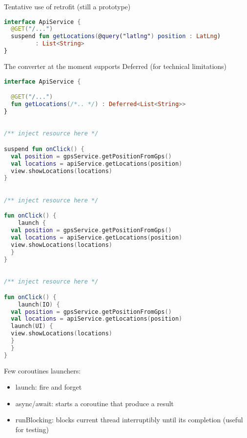 \documentclass[10pt]{beamer}
\begin{document}
\begin{frame}[fragile]
	Tentative use of retrofit (still a prototype) 
\begin{lstlisting}[language=Kotlin, basicstyle=\ttfamily]
interface ApiService {
  @GET("/...")
  suspend fun getLocations(@query("latlng") position : LatLng) 
	     : List<String> 
}
\end{lstlisting}
	The converter at the moment supports Deferred (for technical limitations) 
\begin{lstlisting}[language=Kotlin, basicstyle=\ttfamily]
interface ApiService {

  @GET("/...")
  fun getLocations(/*.. */) : Deferred<List<String>>
}
\end{lstlisting}
\end{frame}
\begin{frame}[fragile]
\begin{lstlisting}[language=Kotlin, basicstyle=\ttfamily]

/** inject resource here */

suspend fun onClick() {
  val position = gpsService.getPositionFromGps()
  val locations = apiService.getLocations(position)
  view.showLocations(locations)
}
\end{lstlisting}
\end{frame}

\begin{frame}[fragile]
\begin{lstlisting}[language=Kotlin, basicstyle=\ttfamily]

/** inject resource here */

fun onClick() {
	launch {
  val position = gpsService.getPositionFromGps()
  val locations = apiService.getLocations(position)
  view.showLocations(locations)
  }
}
\end{lstlisting}
\end{frame}
\begin{frame}[fragile]
\begin{lstlisting}[language=Kotlin, basicstyle=\ttfamily]

/** inject resource here */

fun onClick() {
	launch(IO) {
  val position = gpsService.getPositionFromGps()
  val locations = apiService.getLocations(position)
  launch(UI) {
  view.showLocations(locations)
  }
  }
}
\end{lstlisting}
\end{frame}

\begin{frame}
Few coroutines launchers:	
	\begin{itemize}
		\item  launch: fire and forget
		\item async/await: starts a coroutine that produce a result 
		\item runBlocking:  blocks current thread interruptibly until its completion (useful for testing) 
	\end{itemize}

\end{frame}
\end{document}
